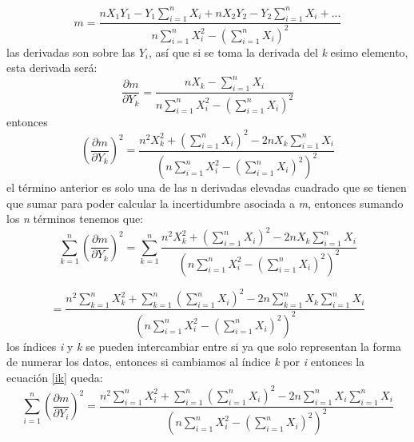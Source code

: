\documentclass[12pt,letterpaper]{report}
\begin{document}
\begin{equation}
m=\dfrac{n X_{1}Y_{1}- Y_{1}\displaystyle\sum_{i=1}^{n} X_{i} + n X_{2}Y_{2}- Y_{2}\displaystyle\sum_{i=1}^{n} X_{i} + ...}{n \displaystyle\sum_{i=1}^{n} X_{i}^{2}- \left( \displaystyle\sum_{i=1}^{n} X_{i} \right) ^{2} }
\end{equation}
las derivadas son sobre las $ Y_{i} $, así que si se toma la derivada del \textit{k} esimo elemento, esta derivada será:
\begin{equation}
\dfrac{\partial m}{\partial Y_{k}} = \dfrac{n X_{k}- \displaystyle\sum_{i=1}^{n} X_{i}}{n \displaystyle\sum_{i=1}^{n} X_{i}^{2}- \left( \displaystyle\sum_{i=1}^{n} X_{i} \right) ^{2}}
\end{equation}
entonces
\begin{equation}
\left( \dfrac{\partial m}{\partial Y_{k}} \right) ^{2} =
\dfrac{n^{2} X_{k}^{2} + \left(  \displaystyle\sum_{i=1}^{n} X_{i}  \right)^{2} -2n X_{k} \displaystyle\sum_{i=1}^{n} X_{i}   }{\left( n \displaystyle\sum_{i=1}^{n} X_{i}^{2}- \left( \displaystyle\sum_{i=1}^{n} X_{i} \right) ^{2}\right) ^{2}}
\end{equation}
el término anterior es solo una de las n derivadas elevadas cuadrado que se tienen que sumar para poder calcular la incertidumbre asociada a \textit{m},  entonces sumando los \textit{n} términos tenemos que:
\begin{equation}
\displaystyle\sum_{k=1}^{n} \left( \dfrac{\partial m}{\partial Y_{k}} \right) ^{2} = \displaystyle\sum_{k=1}^{n}  \dfrac{n^{2} X_{k}^{2} +  \left( \displaystyle\sum_{i=1}^{n} X_{i}\right)^{2} -2n X_{k} \displaystyle\sum_{i=1}^{n} X_{i}   }{\left( n \displaystyle\sum_{i=1}^{n} X_{i}^{2}- \left( \displaystyle\sum_{i=1}^{n} X_{i} \right) ^{2}\right) ^{2}}
\end{equation}

\begin{equation}\label{ik}
 = \dfrac{n^{2} \displaystyle\sum_{k=1}^{n} X_{k}^{2} + \displaystyle\sum_{k=1}^{n} \left(  \displaystyle\sum_{i=1}^{n} X_{i} \right)^{2} -2n \displaystyle\sum_{k=1}^{n} X_{k} \displaystyle\sum_{i=1}^{n} X_{i}   }{\left( n \displaystyle\sum_{i=1}^{n} X_{i}^{2}- \left( \displaystyle\sum_{i=1}^{n} X_{i} \right) ^{2}\right) ^{2}}
\end{equation}
los índices \textit{i} y \textit{k} se pueden intercambiar entre si ya que solo representan la forma de numerar los datos, entonces si cambiamos al índice \textit{k} por \textit{i} entonces  la ecuación \ref{ik} queda:
 \begin{equation}
 \displaystyle\sum_{i=1}^{n} \left( \dfrac{\partial m}{\partial Y_{i}} \right) ^{2} =
 \dfrac{n^{2} \displaystyle\sum_{i=1}^{n} X_{i}^{2} + \displaystyle\sum_{i=1}^{n} \left(  \displaystyle\sum_{i=1}^{n} X_{i} \right)^{2} -2n \displaystyle\sum_{i=1}^{n} X_{i} \displaystyle\sum_{i=1}^{n} X_{i}   }{\left( n \displaystyle\sum_{i=1}^{n} X_{i}^{2}- \left( \displaystyle\sum_{i=1}^{n} X_{i} \right) ^{2}\right) ^{2}}
 \end{equation}
\end{document}
